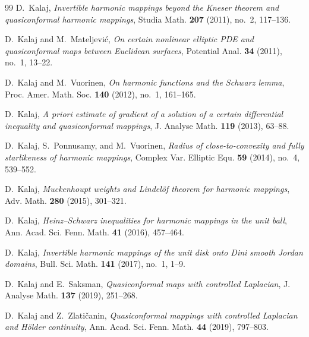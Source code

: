 \documentclass{amsart}
\begin{document}
\begin{thebibliography}{99}
D.~Kalaj,
\newblock \emph{Invertible harmonic mappings beyond the Kneser theorem and quasiconformal harmonic mappings},
\newblock Studia Math. \textbf{207} (2011), no.~2, 117--136.

D.~Kalaj and M.~Mateljevi\'{c},
\newblock \emph{On certain nonlinear elliptic PDE and quasiconformal maps between Euclidean surfaces},
\newblock Potential Anal. \textbf{34} (2011), no.~1, 13--22.

D.~Kalaj and M.~Vuorinen,
\newblock \emph{On harmonic functions and the Schwarz lemma},
\newblock Proc. Amer. Math. Soc. \textbf{140} (2012), no.~1, 161--165.

D.~Kalaj,
\newblock \emph{A priori estimate of gradient of a solution of a certain differential inequality and quasiconformal mappings},
\newblock J. Analyse Math. \textbf{119} (2013), 63--88.

D.~Kalaj, S.~Ponnusamy, and M.~Vuorinen,
\newblock \emph{Radius of close-to-convexity and fully starlikeness of harmonic mappings},
\newblock Complex Var. Elliptic Equ. \textbf{59} (2014), no.~4, 539--552.

D.~Kalaj,
\newblock \emph{Muckenhoupt weights and Lindel\"of theorem for harmonic mappings},
\newblock Adv. Math. \textbf{280} (2015), 301--321.

D.~Kalaj,
\newblock \emph{Heinz--Schwarz inequalities for harmonic mappings in the unit ball},
\newblock Ann. Acad. Sci. Fenn. Math. \textbf{41} (2016), 457--464.

D.~Kalaj,
\newblock \emph{Invertible harmonic mappings of the unit disk onto Dini smooth Jordan domains},
\newblock Bull. Sci. Math. \textbf{141} (2017), no.~1, 1--9.

D.~Kalaj and E.~Saksman,
\newblock \emph{Quasiconformal maps with controlled Laplacian},
\newblock J. Analyse Math. \textbf{137} (2019), 251--268.

D.~Kalaj and Z.~Zlati\v{c}anin,
\newblock \emph{Quasiconformal mappings with controlled Laplacian and H\"older continuity},
\newblock Ann. Acad. Sci. Fenn. Math. \textbf{44} (2019), 797--803.


\end{thebibliography}
\end{document}
